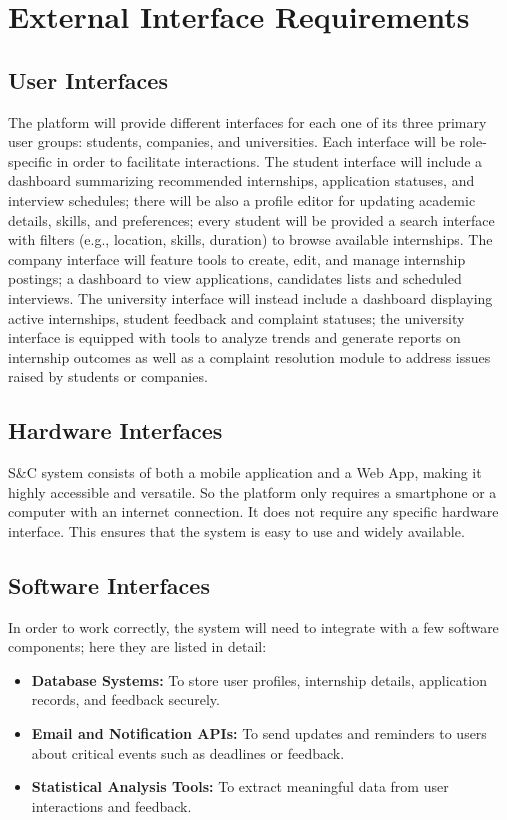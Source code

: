 \section{External Interface Requirements}
\label{sec:external_interface_requirements}%

\subsection{User Interfaces}
\label{subsec:user_interfaces}%
The platform will provide different interfaces for each one of its three primary user groups: students, companies, and universities. Each interface will be role-specific in order to facilitate interactions. The student interface will include a dashboard summarizing recommended internships, application statuses, and interview schedules; there will be also a profile editor for updating academic details, skills, and preferences; every student will be provided a search interface with filters (e.g., location, skills, duration) to browse available internships. The company interface will feature tools to create, edit, and manage internship postings; a dashboard to view applications, candidates lists  and scheduled interviews. The university interface will instead include a dashboard displaying active internships, student feedback and complaint statuses; the university interface is equipped with tools to analyze trends and generate reports on internship outcomes as well as a complaint resolution module to address issues raised by students or companies.

\subsection{Hardware Interfaces}
\label{subsec:hardware_interfaces}%
S\&C system consists of both a mobile application and a Web App, making it highly accessible and versatile. So the platform only requires a smartphone or a computer with an internet connection. It does not require any specific hardware interface. This ensures that the system is easy to use and widely available.
\subsection{Software Interfaces}
\label{subsec:software_interfaces}%
In order to work correctly, the system will need to integrate with a few software components; here they are listed in detail:
\begin{itemize}
    \item \textbf{Database Systems:} To store user profiles, internship details, application records, and feedback securely.
    \item \textbf{Email and Notification APIs:} To send updates and reminders to users about critical events such as deadlines or feedback.
    \item \textbf{Statistical Analysis Tools:} To extract meaningful data from user interactions and feedback.
\end{itemize}
 
